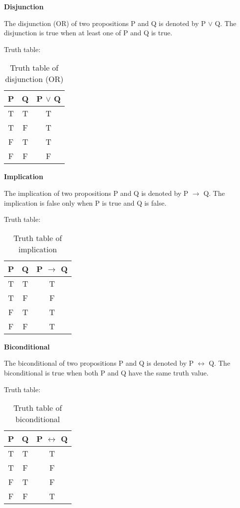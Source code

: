 \textbf{Disjunction}

The disjunction (OR) of two propositions P and Q is denoted by P $\lor$ Q.
The disjunction is true when at least one of P and Q is true.

Truth table:
\begin{table}[H]
    \centering
    \begin{tabular}{|c|c|c|}
        \hline
        P & Q & P $\lor$ Q \\
        \hline
        T & T & T          \\
        T & F & T          \\
        F & T & T          \\
        F & F & F          \\
        \hline
    \end{tabular}
    \caption{Truth table of disjunction (OR)}
    \label{tab:truth_table_disjunction}
\end{table}

\textbf{Implication}

The implication of two propositions P and Q is denoted by P $\rightarrow$ Q.
The implication is false only when P is true and Q is false.

Truth table:
\begin{table}[H]
    \centering
    \begin{tabular}{|c|c|c|}
        \hline
        P & Q & P $\rightarrow$ Q \\
        \hline
        T & T & T                 \\
        T & F & F                 \\
        F & T & T                 \\
        F & F & T                 \\
        \hline
    \end{tabular}
    \caption{Truth table of implication}
    \label{tab:truth_table_implication}
\end{table}

\textbf{Biconditional}

The biconditional of two propositions P and Q is denoted by P $\leftrightarrow$ Q.
The biconditional is true when both P and Q have the same truth value.

Truth table:
\begin{table}[H]
    \centering
    \begin{tabular}{|c|c|c|}
        \hline
        P & Q & P $\leftrightarrow$ Q \\
        \hline
        T & T & T                     \\
        T & F & F                     \\
        F & T & F                     \\
        F & F & T                     \\
        \hline
    \end{tabular}
    \caption{Truth table of biconditional}
    \label{tab:truth_table_biconditional}
\end{table}


